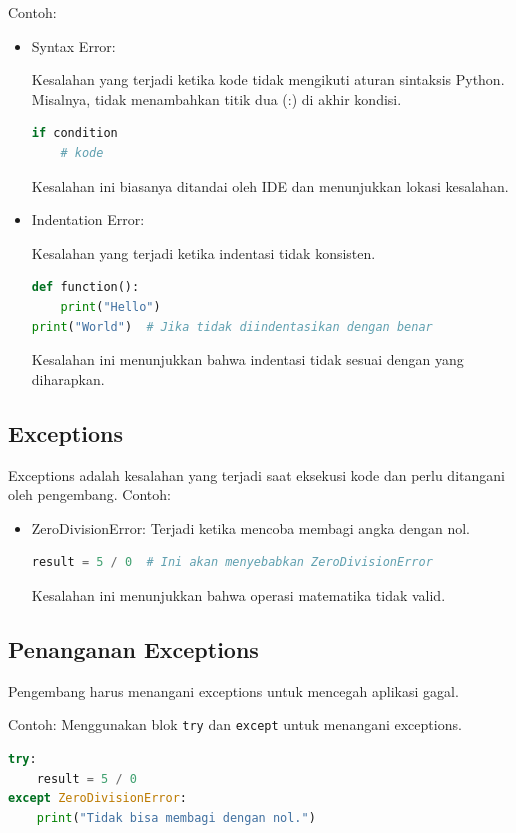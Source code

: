 \documentclass{article}
\begin{document}
Contoh:
\begin{itemize}
    \item Syntax Error:

          Kesalahan yang terjadi ketika kode tidak mengikuti aturan sintaksis Python. Misalnya, tidak menambahkan titik dua (:) di akhir kondisi.
          \begin{lstlisting}[language=Python, caption={}, captionpos=b]
if condition
    # kode
\end{lstlisting}
          Kesalahan ini biasanya ditandai oleh IDE dan menunjukkan lokasi kesalahan.

    \item Indentation Error:

          Kesalahan yang terjadi ketika indentasi tidak konsisten.
          \begin{lstlisting}[language=Python, caption={}, captionpos=b]
def function():
    print("Hello")
print("World")  # Jika tidak diindentasikan dengan benar
\end{lstlisting}
          Kesalahan ini menunjukkan bahwa indentasi tidak sesuai dengan yang diharapkan.
\end{itemize}

\subsection{Exceptions}
Exceptions adalah kesalahan yang terjadi saat eksekusi kode dan perlu ditangani oleh pengembang.
Contoh:
\begin{itemize}
    \item ZeroDivisionError: Terjadi ketika mencoba membagi angka dengan nol.

          \begin{lstlisting}[language=Python, caption={}, captionpos=b]
result = 5 / 0  # Ini akan menyebabkan ZeroDivisionError
\end{lstlisting}
          Kesalahan ini menunjukkan bahwa operasi matematika tidak valid.
\end{itemize}

\subsection{Penanganan Exceptions}
Pengembang harus menangani exceptions untuk mencegah aplikasi gagal.

Contoh: Menggunakan blok \verb|try| dan \verb|except| untuk menangani exceptions.
\begin{lstlisting}[language=Python, caption={}, captionpos=b]
try:
    result = 5 / 0
except ZeroDivisionError:
    print("Tidak bisa membagi dengan nol.")
\end{lstlisting}
\end{document}
